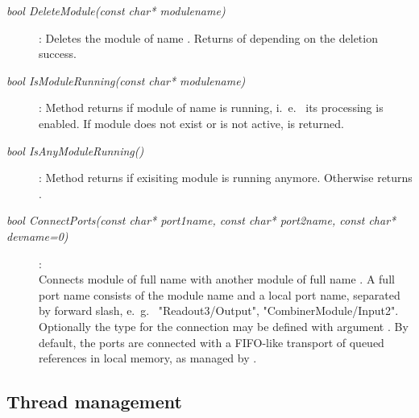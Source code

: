\begin{description}
\item[\em bool DeleteModule\small (const char* modulename)] :
Deletes the module of name . Returns  of  
 depending on the deletion success.

\item[\em bool IsModuleRunning\small (const char* modulename)] :
Method returns  if module of name 
is running, i.~e.~ its processing is enabled. If module does not exist
or is not active,  is returned. 
         
\item[\em bool IsAnyModuleRunning()] :
Method returns  if  exisiting module is running anymore.
Otherwise returns .

\item[\em bool ConnectPorts\small (const char* port1name,
                           const char* port2name,
                           const char* devname=0)] :
 \\
Connects module  of full name 
with another  module  of full name .
A full port name consists of the module name and a local port name,
separated by forward slash, e.~g.~ "Readout3/Output", "CombinerModule/Input2".
Optionally the  type for the connection  may
be defined with argument . By default, the ports are connected
with a FIFO-like transport of queued  references in local memory,
as managed by .			   
			   
\end{description}

\subsection{Thread management}	

